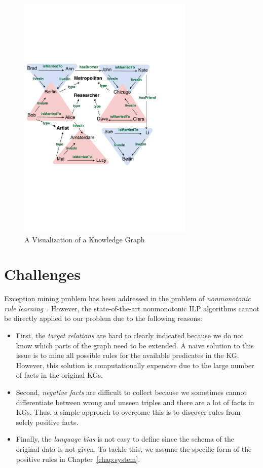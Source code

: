\begin{figure}[t]
\centering
\includegraphics[width=0.75\textwidth]{figures/kg_advanced_col}
\caption{A Visualization of a Knowledge Graph}
\label{fig1.1}
\end{figure}

\section{Challenges}

Exception mining problem has been addressed in the problem of \textit{nonmonotonic rule learning}~\cite{ref11, ref40, ref41, ref32, ref42}. However, the state-of-the-art nonmonotonic ILP algorithms cannot be directly applied to our problem due to the following reasons:
\begin{itemize}
\item First, the \textit{target relations} are hard to clearly indicated because we do not know which parts of the graph need to be extended. A naive solution to this issue is to mine all possible rules for the available predicates in the KG. However, this solution is computationally expensive due to the large number of facts in the original KGs.
\item Second, \textit{negative facts} are difficult to collect because we sometimes cannot differentiate between wrong and unseen triples and there are a lot of facts in KGs. Thus, a simple approach to overcome this is to discover rules from solely positive facts.
\item Finally, the \textit{language bias} is not easy to define since the schema of the original data is not given. To tackle this, we assume the specific form of the positive rules in Chapter~\ref{chap:system}.
\end{itemize}

